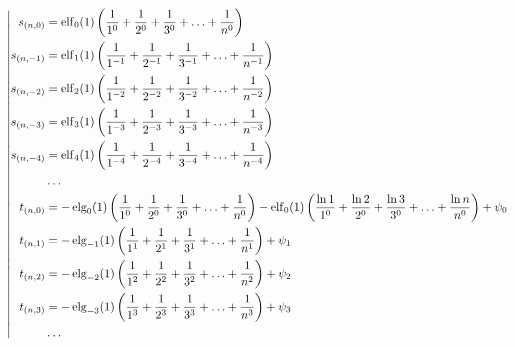\begin{equation*} \left| \begin{aligned}
s_{(n,0)} &=
  \elf_0(1) \left(
  \frac{1}{1^0}
+ \frac{1}{2^0}
+ \frac{1}{3^0}
+ \ldots
+ \frac{1}{n^0} \right) \\
%
s_{(n,-1)} &=
  \elf_1(1) \left(
  \frac{1}{1^{-1}}
+ \frac{1}{2^{-1}}
+ \frac{1}{3^{-1}}
+ \ldots
+ \frac{1}{n^{-1}} \right) \\
%
s_{(n,-2)} &=
  \elf_2(1) \left(
  \frac{1}{1^{-2}}
+ \frac{1}{2^{-2}}
+ \frac{1}{3^{-2}}
+ \ldots
+ \frac{1}{n^{-2}} \right) \\
%
s_{(n,-3)} &=
  \elf_3(1) \left(
  \frac{1}{1^{-3}}
+ \frac{1}{2^{-3}}
+ \frac{1}{3^{-3}}
+ \ldots
+ \frac{1}{n^{-3}} \right) \\
%
s_{(n,-4)} &=
  \elf_4(1) \left(
  \frac{1}{1^{-4}}
+ \frac{1}{2^{-4}}
+ \frac{1}{3^{-4}}
+ \ldots
+ \frac{1}{n^{-4}} \right) \\
%
&\ldots \\
%
t_{(n,0)} &=
- \elg_0(1) \left(
  \frac{1}{1^0}
+ \frac{1}{2^0}
+ \frac{1}{3^0}
+ \ldots
+ \frac{1}{n^0} \right)
- \elf_0(1) \left(
  \frac{\ln{1}}{1^0}
+ \frac{\ln{2}}{2^0}
+ \frac{\ln{3}}{3^0}
+ \ldots
+ \frac{\ln{n}}{n^0} \right)
+ \psi_0 \\
%
t_{(n,1)} &=
- \elg_{-1}(1) \left(
  \frac{1}{1^1}
+ \frac{1}{2^1}
+ \frac{1}{3^1}
+ \ldots
+ \frac{1}{n^1} \right)
+ \psi_1 \\
%
t_{(n,2)} &=
- \elg_{-2}(1) \left(
  \frac{1}{1^2}
+ \frac{1}{2^2}
+ \frac{1}{3^2}
+ \ldots
+ \frac{1}{n^2} \right)
+ \psi_2 \\
%
t_{(n,3)} &=
- \elg_{-3}(1) \left(
  \frac{1}{1^3}
+ \frac{1}{2^3}
+ \frac{1}{3^3}
+ \ldots
+ \frac{1}{n^3} \right)
+ \psi_3 \\
%
&\ldots \\
\end{aligned} \right. \end{equation*}